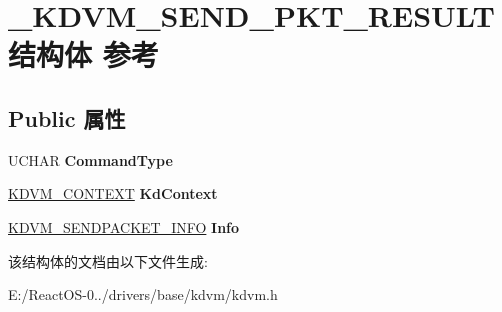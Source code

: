 \hypertarget{struct___k_d_v_m___s_e_n_d___p_k_t___r_e_s_u_l_t}{}\section{\+\_\+\+K\+D\+V\+M\+\_\+\+S\+E\+N\+D\+\_\+\+P\+K\+T\+\_\+\+R\+E\+S\+U\+L\+T结构体 参考}
\label{struct___k_d_v_m___s_e_n_d___p_k_t___r_e_s_u_l_t}
\subsection*{Public 属性}
\begin{DoxyCompactItemize}
\item 
\mbox{\label{struct___k_d_v_m___s_e_n_d___p_k_t___r_e_s_u_l_t_af5f23d63da50b1067d7a895f9fc1b35f}} 
U\+C\+H\+AR {\bfseries Command\+Type}
\item 
\mbox{\label{struct___k_d_v_m___s_e_n_d___p_k_t___r_e_s_u_l_t_a26eee23fde32c46a13d6bfb653fc12a1}} 
\hyperlink{struct___k_d_v_m___c_o_n_t_e_x_t}{K\+D\+V\+M\+\_\+\+C\+O\+N\+T\+E\+XT} {\bfseries Kd\+Context}
\item 
\mbox{\label{struct___k_d_v_m___s_e_n_d___p_k_t___r_e_s_u_l_t_a3f90b9f07a70981372e1d4b9a2bfe786}} 
\hyperlink{struct_k_d_v_m___s_e_n_d_p_a_c_k_e_t___i_n_f_o}{K\+D\+V\+M\+\_\+\+S\+E\+N\+D\+P\+A\+C\+K\+E\+T\+\_\+\+I\+N\+FO} {\bfseries Info}
\end{DoxyCompactItemize}


该结构体的文档由以下文件生成\+:\begin{DoxyCompactItemize}
\item 
E\+:/\+React\+O\+S-\/0../drivers/base/kdvm/kdvm.\+h\end{DoxyCompactItemize}
